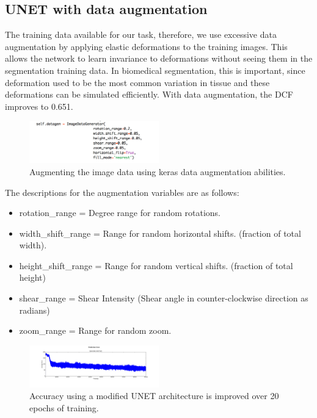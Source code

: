 \documentclass[letterpaper]{article}
\begin{document}
\subsection{UNET with data augmentation}

The training data available for our task, therefore, we use excessive data augmentation by applying elastic deformations to the training images. This allows the network to learn invariance to deformations without seeing them in the segmentation training data. In biomedical segmentation, this is important, since deformation used to be the most common variation in tissue and these deformations can be simulated efficiently. With data augmentation, the DCF improves to 0.651.

 \begin{figure}[H]
  \centerline{\includegraphics[width=0.5\textwidth]{Images/KerasDataAugmentation.png}}
  \caption{Augmenting the image data using keras data augmentation abilities.}
  \label{fig:unet3}
\end{figure}

The descriptions for the augmentation variables are as follows:

\begin{itemize}
  \item rotation\_range = Degree range for random rotations.
  \item width\_shift\_range =  Range for random horizontal shifts. (fraction of total width). 
  \item height\_shift\_range = Range for random vertical shifts. (fraction of total height)
  \item shear\_range = Shear Intensity (Shear angle in counter-clockwise direction as radians)
  \item zoom\_range = Range for random zoom.
\end{itemize}


 \begin{figure}[H]
  \centerline{\includegraphics[width=0.5\textwidth]{Plots/AverageErrorKullEvery5000.png}}
  \caption{Accuracy using a modified UNET architecture is improved over 20 epochs of training.}
  \label{fig:trainingovertime2.}
\end{figure}
\end{document}

